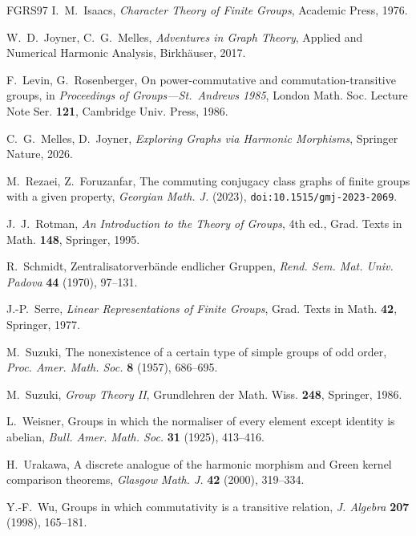 \documentclass[12pt,letterpaper]{article}
\numberwithin{equation}{section}
\theoremstyle{plain}
\theoremstyle{definition}
\begin{document}
\begin{thebibliography}{FGRS97}
 I.~M.~Isaacs, \emph{Character Theory of Finite
Groups}, Academic Press, 1976.

 W.~D.~Joyner, C.~G.~Melles, \emph{Adventures in Graph
Theory}, Applied and Numerical Harmonic Analysis, Birkh\"auser, 2017.

 F.~Levin, G.~Rosenberger, On power-commutative and
commutation-transitive groups, in \emph{Proceedings of Groups---St.\
Andrews 1985}, London Math. Soc. Lecture Note Ser. \textbf{121}, Cambridge
Univ. Press, 1986.

 C.~G.~Melles, D.~Joyner, \emph{Exploring Graphs via
Harmonic Morphisms}, Springer Nature, 2026.

 M.~Rezaei, Z.~Foruzanfar, The commuting conjugacy
class graphs of finite groups with a given property, \emph{Georgian Math.
J.} (2023), \texttt{doi:10.1515/gmj-2023-2069}.

 J.~J.~Rotman, \emph{An Introduction to the Theory of
Groups}, 4th ed., Grad. Texts in Math. \textbf{148}, Springer, 1995.

 R.~Schmidt, Zentralisatorverb\"ande endlicher
Gruppen, \emph{Rend. Sem. Mat. Univ. Padova} \textbf{44} (1970), 97--131.

 J.-P.~Serre, \emph{Linear Representations of Finite
Groups}, Grad. Texts in Math. \textbf{42}, Springer, 1977.

 M.~Suzuki, The nonexistence of a certain type of
simple groups of odd order, \emph{Proc. Amer. Math. Soc.} \textbf{8}
(1957), 686--695.

 M.~Suzuki, \emph{Group Theory II}, Grundlehren der
Math. Wiss. \textbf{248}, Springer, 1986.

 L.~Weisner, Groups in which the normaliser of every
element except identity is abelian, \emph{Bull. Amer. Math. Soc.}
\textbf{31} (1925), 413--416.

 H.~Urakawa, A discrete analogue of the harmonic
morphism and Green kernel comparison theorems, \emph{Glasgow Math. J.}
\textbf{42} (2000), 319--334.

 Y.-F.~Wu, Groups in which commutativity is a
transitive relation, \emph{J. Algebra} \textbf{207} (1998), 165--181.

\end{thebibliography}
\end{document}
